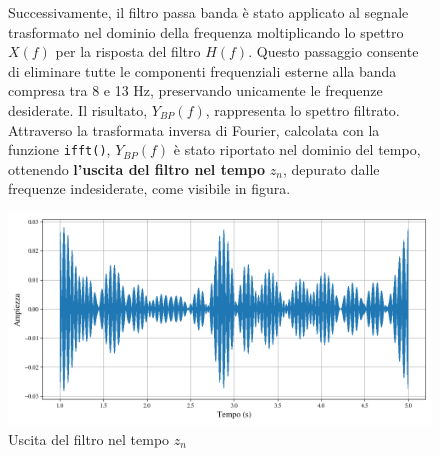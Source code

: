 \documentclass{report}
\begin{document}
\begin{figure}[!h]
\begin{minipage}{0.4\textwidth}
Successivamente, il filtro passa banda è stato applicato al segnale trasformato nel dominio della frequenza moltiplicando lo spettro $X(f)$ per la risposta del filtro $H(f)$. Questo passaggio consente di eliminare tutte le componenti frequenziali esterne alla banda compresa tra 8 e 13 Hz, preservando unicamente le frequenze desiderate. Il risultato, $Y_{BP}(f)$, rappresenta lo spettro filtrato. Attraverso la trasformata inversa di Fourier, calcolata con la funzione \texttt{ifft()\footnotemark[4]}, $Y_{BP}(f)$ è stato riportato nel dominio del tempo, ottenendo \textbf{l'uscita del filtro nel tempo} $z_n$, depurato dalle frequenze indesiderate, come visibile in figura.
\end{minipage}
\hfill
\hspace{0.5cm}
\begin{minipage}{0.55\textwidth}
\centering
\includegraphics[width=\textwidth]{plot5}
\caption{Uscita del filtro nel tempo $z_n$}    
\end{minipage}
\end{figure}


\end{document}

